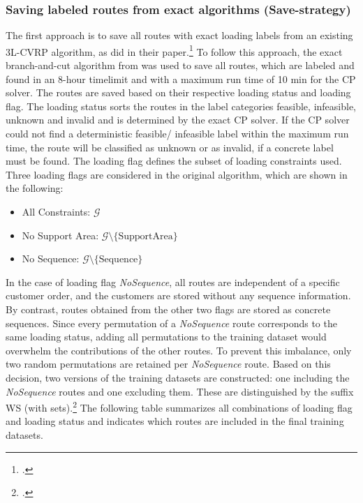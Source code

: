 \subsubsection{Saving labeled routes from exact algorithms (Save-strategy)}
The first approach is to save all routes with exact loading labels from an existing \gls{3L-CVRP}
algorithm, as \cite{zhang_learning-based_2022} did in their paper.\footcite[cf.][]{zhang_learning-based_2022}
To follow this approach, the exact branch-and-cut algorithm from \cite{tamke_branch-and-cut_2024} was
used to save all routes, which are labeled and found in an 8-hour timelimit and with a maximum run time of 10 min for the \gls{CP} solver.
The routes are saved based on their respective loading status and loading flag. The loading status sorts the routes in the
label categories feasible, infeasible, unknown and invalid and is determined by the exact \gls{CP} solver.
If the \gls{CP} solver could not find a deterministic feasible/ infeasible label within the maximum run time, the route
will be classified as unknown or as invalid, if a concrete label must be found. The loading flag defines the subset of
loading constraints used. Three loading flags are considered in the original algorithm, which are shown
in the following:
\begin{itemize}
    \item All Constraints: $\mathcal{G}$
    \item No Support Area: $\mathcal{G}\setminus \{\text{SupportArea}\}$
    \item No Sequence: $\mathcal{G}\setminus \{\text{Sequence}\}$
\end{itemize}
In the case of loading flag \textit{NoSequence}, all routes are independent of a specific customer order, and the customers are stored
without any sequence information. By contrast, routes obtained from the other two flags are stored as concrete sequences.
Since every permutation of a \textit{NoSequence} route corresponds to the same loading status, adding all permutations to the training
dataset would overwhelm the contributions of the other routes. To prevent this imbalance, only two random permutations are
retained per \textit{NoSequence} route. Based on this decision, two versions of the training datasets are constructed:
one including the \textit{NoSequence} routes and one excluding them. These are distinguished by the suffix WS (with sets).\footcites[Retrieved from][]{tamke_repository_2024}[cf.][]{tamke_branch-and-cut_2024}
The following table summarizes all combinations of loading flag and loading status and indicates which routes are included in
the final training datasets.

